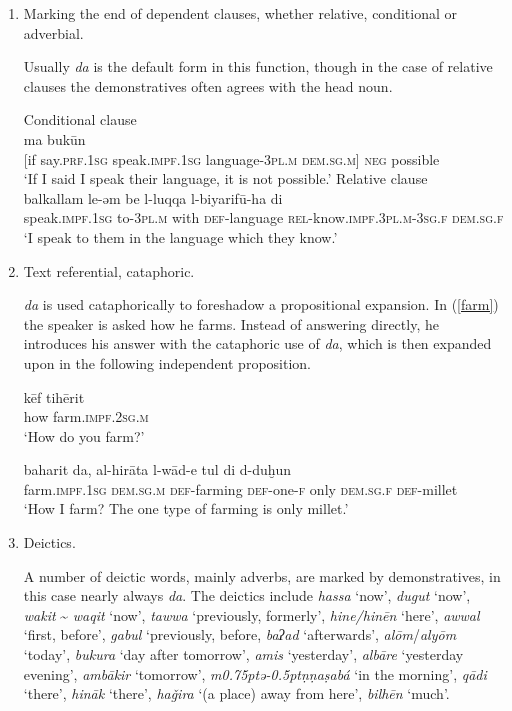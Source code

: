 \documentclass[output=paper]{langsci/langscibook}
\begin{document}
\begin{enumerate}[leftmargin=*]

\item Marking the end of dependent clauses, whether {relative}, {conditional} or adverbial.

Usually \textit{da} is the default form in this function, though in the case of {relative} clauses the {demonstratives} often agrees with the head noun.


\ea\label{gul}
 {\label{bkm:Ref520916112}Conditional clause}\\
 ma bukūn\\
     [if say.\textsc{prf.1sg} speak.\textsc{impf.1sg} language-\textsc{3pl.m} \textsc{dem.sg.m]} \textsc{neg} possible\\
\glt ‘If I said I speak their language, it is not possible.’
\ex \label{luqqa}
{}{}{\label{bkm:Ref520916704}Relative clause}\\
\gll balkallam le-əm be l-luqqa l-biyarifū-ha di\\
     speak.\textsc{impf.1sg} to-\textsc{3pl.m} with \textsc{def}-language \textsc{rel-}know.\textsc{impf.3pl.m-3sg.f} \textsc{dem.sg.f}\\
\glt ‘I speak to them in the language which they know.’
\z

\item Text referential, cataphoric.

\textit{da} is used cataphorically to foreshadow a propositional expansion. In (\ref{farm}) the speaker is asked how he farms. Instead of answering directly, he introduces his answer with the cataphoric use of \textit{da}, which is then expanded upon in the following independent proposition.

\ea\label{farm}
\ea
\gll kēf tihērit\\
     how farm.\textsc{impf.2sg.m}\\
\glt ‘How do you farm?’

\ex
\gll baharit da, al-hirāta l-wād-e tul di d-duḫun\\
     farm.\textsc{impf.1sg} \textsc{dem.sg.m} \textsc{def-}farming \textsc{def-}one-\textsc{f} only \textsc{dem.sg.f} \textsc{def-}millet\\
\glt ‘How I farm? The one type of farming is only millet.’\label{tul}
\z
\z

\item Deictics.

A number of deictic words, mainly adverbs, are marked by {demonstratives}, in this case nearly always \textit{da}. The deictics include \textit{hassa} ‘now’, \textit{dugut} ‘now’, \textit{wakit} {\textasciitilde}  \textit{waqit} ‘now’, \textit{tawwa} ‘previously, formerly’, \textit{hine/hinēn} ‘here’, \textit{awwal} ‘first, before’, \textit{gabul} ‘previously, before, \textit{baʔad} ‘afterwards’, \textit{alōm}/\textit{alyōm} ‘today’, \textit{bukura} ‘day after tomorrow’, \textit{amis} ‘yesterday’, \textit{albāre} ‘yesterday evening’, \textit{ambākir} ‘tomorrow’, \textit{m\kern 0.75ptǝ\kern -0.5ptṇṇaṣabá} ‘in the morning’, \textit{qādi} ‘there’, \textit{hināk} ‘there’, \textit{haǧira} ‘(a place) away from here’, \textit{bilhēn} ‘much’.


\end{enumerate}
\end{document}
